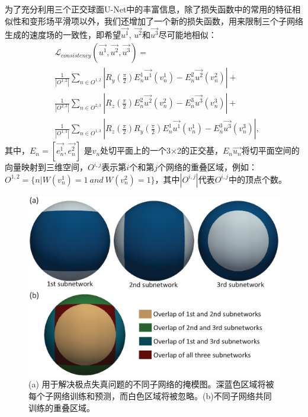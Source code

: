 为了充分利用三个正交球面U-Net中的丰富信息，除了损失函数中的常用的特征相似性和变形场平滑项以外，我们还增加了一个新的损失函数，用来限制三个子网络生成的速度场的一致性，即希望$\overrightarrow{u^1}$, $\overrightarrow{u^2}$和$\overrightarrow{u^3}$尽可能地相似：
\begin{equation}
\begin{split}
&{\mathcal{L}}_{consistency}({\overrightarrow{u^1}},{\overrightarrow{u^2}},{\overrightarrow{u^3}}) = \\
& \frac{1}{{\left| {{O^{1,2}}} \right|}}\sum\nolimits_{n \in {O^{1,2}}} {\left| {{R_y}(\frac{\pi }{2})E_n^1{\overrightarrow{u^1}}(v_n^1) - E_n^2{\overrightarrow{u^2}}(v_n^2)} \right| + } \\
&\frac{1}{{\left| {{O^{2,3}}} \right|}}\sum\nolimits_{n \in {O^{2,3}}} {\left| {{R_z}(\frac{\pi }{2})E_n^2{\overrightarrow{u^2}}(v_n^2) - E_n^3{\overrightarrow{u^3}}(v_n^3)} \right| + } \\
&\frac{1}{{\left| {{O^{1,3}}} \right|}}\sum\nolimits_{n \in {O^{1,3}}} {\left| {{R_z}(\frac{\pi }{2}){R_y}(\frac{\pi }{2})E_n^1{\overrightarrow{u^1}}(v_n^1) - E_n^3{\overrightarrow{u^3}}(v_n^3)} \right|},
\end{split}
\end{equation}
其中，$E_n=[\overrightarrow{e_n^1}, \overrightarrow{e_n^2}]$ 是$v_n$处切平面上的一个3$\times$2的正交基，$E_n\overrightarrow{u_n}$将切平面空间的向量映射到三维空间，$O^{i,j}$表示第$i$个和第$j$个网络的重叠区域，例如：$O^{1,2}=\{n|W(v_n^1)=1 \: and \: W(v_n^2)=1\}$，其中$|O^{i,j}|$代表$O^{i,j}$中的顶点个数。

\begin{figure}[t]
	\centering
	\includegraphics[width=0.7\linewidth]{figure/index.eps}
	\caption{(a) 用于解决极点失真问题的不同子网络的掩模图。深蓝色区域将被每个子网络训练和预测，而白色区域将被忽略。(b)不同子网络共同训练的重叠区域。}
	\label{fig:S3Reg_index}
\end{figure}

